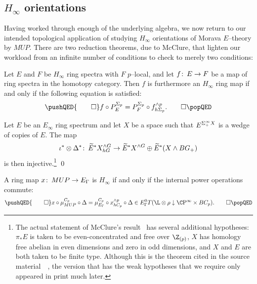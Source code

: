 \subsection*{$H_\infty$ orientations}

Having worked through enough of the underlying algebra, we now return to our intended topological application of studying $H_\infty$ orientations of Morava $E$--theory by $MUP$.  There are two reduction theorems, due to McClure, that lighten our workload from an infinite number of conditions to check to merely two conditions:

\begin{theorem}
Let $E$ and $F$ be $H_\infty$ ring spectra with $F$ $p$--local, and let $f\colon\thinspace E \to F$ be a map of ring spectra in the homotopy category.  Then $f$ is furthermore an $H_\infty$ ring map if and only if the following equation is satisfied:
\[
\pushQED{\qed}
f \circ P^{\Sigma_p}_E = P^{\Sigma_p}_F \circ f^{\sm p}_{h\Sigma_p}. \qedhere
\popQED
\]
\end{theorem}

\begin{theorem}
Let $E$ be an $E_\infty$ ring spectrum and let $X$ be a space such that $E^{\Sigma^\infty_+ X}$ is a wedge of copies of $E$.  The map \[\iota^* \otimes \Delta^*\colon\thinspace \widetilde E^* X^{\wedge G}_{hG} \to \widetilde E^* X^{\wedge G} \oplus \widetilde E^*(X \wedge BG_+)\] is then injective.\footnote{The actual statement of McClure's result~\cite[Proposition VIII.7.3]{BMMS} has several additional hypotheses: $\pi_* E$ is taken to be even-concentrated and free over $\Z_{(p)}$, $X$ has homology free abelian in even dimensions and zero in odd dimensions, and $X$ and $E$ are both taken to be finite type.  Although this is the theorem cited in the source material~\cite[Section 4]{Ando}~\cite[Proof of Proposition 6.1]{AHSHinfty}, the version that has the weak hypotheses that we require only appeared in print much later.} \qed
\end{theorem}

\begin{corollary}
A ring map $x\colon\thinspace MUP \to E_\Gamma$ is $H_\infty$ if and only if the internal power operations commute: \[
\pushQED{\qed}
x \circ \mu^{C_p}_{MUP} \circ \Delta = \mu^{C_p}_{E_\Gamma} \circ x^{\sm p}_{hC_p} \circ \Delta \in E_\Gamma^0 T(\L \otimes \rho \downarrow \CP^\infty \times BC_p).
\qedhere
\popQED
\]
\end{corollary}

